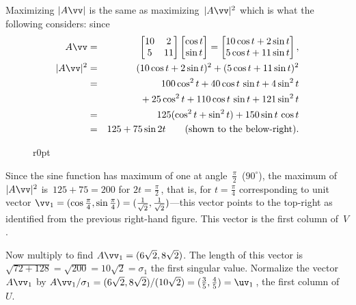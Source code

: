 \begin{example}
\begin{solution}
Maximizing \(|A\vv|\) is the same as maximizing~\(|A\vv|^2\) which is what the following considers: since
\begin{eqnarray*}
A\vv&=&\begin{bmatrix} 10&2\\5&11 \end{bmatrix}
\begin{bmatrix} \cos t\\\sin t \end{bmatrix}
=\begin{bmatrix} 10\cos t+2\sin t\\5\cos t+11\sin t \end{bmatrix},
\\|A\vv|^2&=&(10\cos t+2\sin t)^2+(5\cos t+11\sin t)^2
\\&=&100\cos^2 t+40\cos t\,\sin t+4\sin^2 t
\\&&{}+25\cos^2 t+110\cos t\,\sin t+121\sin^2 t
\\&=&125(\cos^2t+\sin^2t)+150\sin t\,\cos t
\\&=&125+75\sin 2t \qquad(\text{shown to the below-right}).
\end{eqnarray*}

\begin{figure}r{0pt}
\end{figure}
Since the sine function has maximum of one at angle~\(\frac\pi2\)~(\(90^\circ\)), the maximum of~\(|A\vv|^2\) is~\(125+75=200\) for \(2t=\frac\pi2\)\,, that is, for \(t=\frac\pi4\) corresponding to unit vector \(\vv_1=(\cos\frac\pi4,\sin\frac\pi4)=(\frac1{\sqrt2},\frac1{\sqrt2})\)---this vector points to the top-right as identified from the previous right-hand figure.
This vector is the first column of~\(V\).

Now multiply to find \(A\vv_1=(6\sqrt2,8\sqrt2)\).  
The length of this vector is \(\sqrt{72+128}=\sqrt{200}=10\sqrt 2=\sigma_1\) the first singular value.  
Normalize the vector~\(A\vv_1\) by \(A\vv_1/\sigma_1 =(6\sqrt2,8\sqrt2)/(10\sqrt2) =(\frac35,\frac45) =\uv_1\)\,, the first column of~\(U\).


\end{solution}
\end{example}
